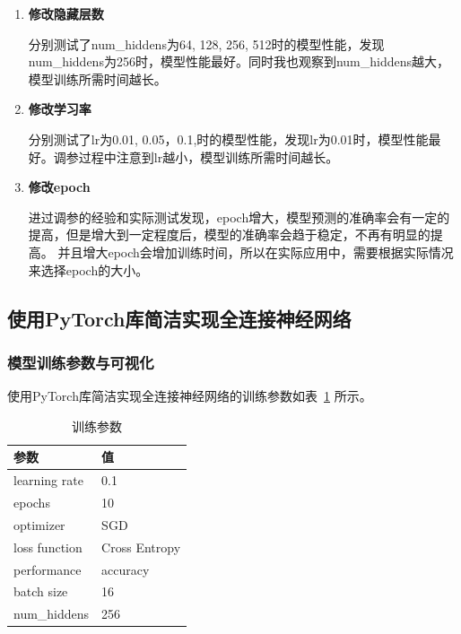 \documentclass[12pt]{article}
\begin{document}
\begin{enumerate}
  \item \textbf{修改隐藏层数}

        分别测试了num\_hiddens为64, 128, 256, 512时的模型性能，发现num\_hiddens为256时，模型性能最好。同时我也观察到num\_hiddens越大，
        模型训练所需时间越长。
  \item \textbf{修改学习率}

        分别测试了lr为0.01, 0.05，0.1,时的模型性能，发现lr为0.01时，模型性能最好。调参过程中注意到lr越小，模型训练所需时间越长。
  \item \textbf{修改epoch}

        进过调参的经验和实际测试发现，epoch增大，模型预测的准确率会有一定的提高，但是增大到一定程度后，模型的准确率会趋于稳定，不再有明显的提高。
        并且增大epoch会增加训练时间，所以在实际应用中，需要根据实际情况来选择epoch的大小。
\end{enumerate}




\subsection{使用PyTorch库简洁实现全连接神经网络}

\subsubsection{模型训练参数与可视化}
使用PyTorch库简洁实现全连接神经网络的训练参数如表~\ref{tab:training-params} 所示。
\begin{table}[htbp]
  \centering
  \caption{训练参数}
  \label{tab:training-params}
  \begin{tabular}{m{3cm}<{\centering}m{3cm}<{\centering}}
    \toprule
    \textbf{参数}   & \textbf{值}    \\[\medskipamount]
    \midrule
    learning rate & 0.1           \\[\medskipamount]
    epochs        & 10            \\[\medskipamount]
    optimizer     & SGD           \\[\medskipamount]
    loss function & Cross Entropy \\[\medskipamount]
    performance   & accuracy      \\[\medskipamount]
    batch size    & 16            \\[\medskipamount]
    num\_hiddens  & 256            \\[\medskipamount]
    \bottomrule
  \end{tabular}
\end{table}
\end{document}
